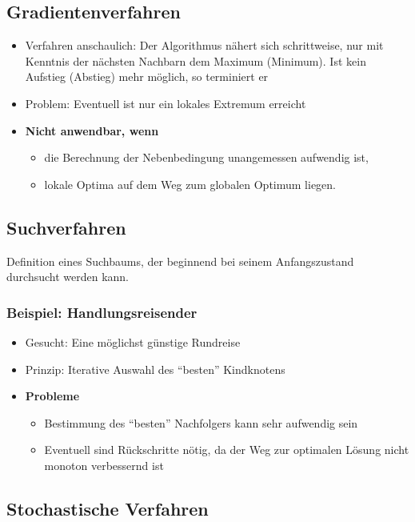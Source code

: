 \subsection{Gradientenverfahren}
\begin{itemize}
	\item Verfahren anschaulich: Der Algorithmus nähert sich schrittweise, nur mit Kenntnis der nächsten Nachbarn dem Maximum (Minimum). Ist kein Aufstieg (Abstieg) mehr möglich, so terminiert er
	\item Problem: Eventuell ist nur ein lokales Extremum erreicht
	\item \textbf{Nicht anwendbar, wenn}
	\begin{itemize}
		\item die Berechnung der Nebenbedingung unangemessen aufwendig ist,
		\item lokale Optima auf dem Weg zum globalen Optimum liegen.
	\end{itemize}
\end{itemize}


\subsection{Suchverfahren}
Definition eines Suchbaums, der beginnend bei seinem Anfangszustand durchsucht werden kann.

\subsubsection{Beispiel: Handlungsreisender}
\begin{itemize}
	\item Gesucht: Eine möglichst günstige Rundreise
	\item Prinzip: Iterative Auswahl des "`besten"' Kindknotens
	\item \textbf{Probleme}
	\begin{itemize}
		\item Bestimmung des "`besten"' Nachfolgers kann sehr aufwendig sein
		\item Eventuell sind Rückschritte nötig, da der Weg zur optimalen Lösung nicht monoton verbessernd ist
	\end{itemize}
\end{itemize}


\subsection{Stochastische Verfahren}

